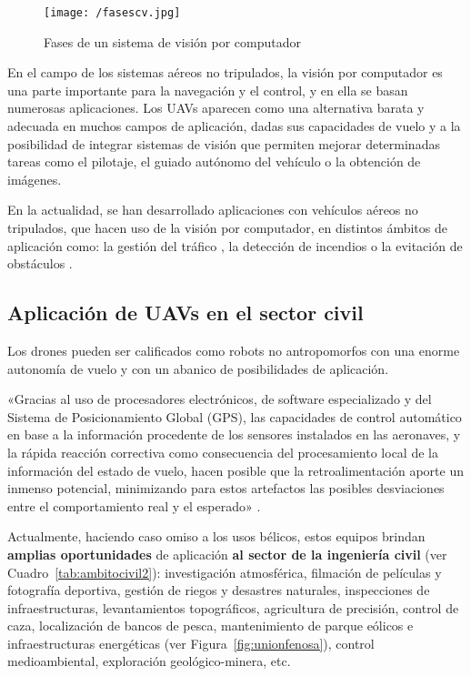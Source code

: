 \begin{figure}[!h]
\begin{center}
\texttt{[image: /fasescv.jpg]}
\caption[Fases de un sistema de visión por computador]{Fases de un sistema de visión por computador \cite{visionporcomputador}}
\label{fig:fasescv}
\end{center}
\end{figure}

En el campo de los sistemas aéreos no tripulados, la visión por computador es una parte importante para la navegación y el control, 
y en ella se basan numerosas aplicaciones. Los \acs{UAV}s aparecen como una alternativa barata y adecuada en muchos campos
de aplicación, dadas sus capacidades de vuelo y a la posibilidad de integrar sistemas de visión que permiten mejorar determinadas 
tareas como el pilotaje, el guiado autónomo del vehículo o la obtención de imágenes.

En la actualidad, se han desarrollado aplicaciones con vehículos aéreos no tripulados, que hacen uso de la visión por computador, en distintos ámbitos de aplicación como: la gestión del tráfico \cite{controltrafico}, la detección de incendios \cite{incendios} o la evitación de obstáculos \cite{obstaculos}.

\subsection{Aplicación de \acs{UAV}s en el sector civil}
\label{sec:ingenieriacivil}

Los drones pueden ser calificados como robots no antropomorfos con una enorme autonomía de vuelo y con un abanico de posibilidades de  aplicación.

«Gracias al uso de procesadores electrónicos, de software especializado y del Sistema de Posicionamiento Global (\acs{GPS}), las capacidades de control automático en base a la información procedente de los sensores instalados en las aeronaves, y la rápida reacción correctiva como consecuencia del procesamiento local de la información del estado de vuelo, hacen posible que la retroalimentación aporte un inmenso potencial,
minimizando para estos artefactos las posibles desviaciones entre el comportamiento real y el esperado» \cite{ambitocivil}.

Actualmente, haciendo caso omiso a los usos bélicos, estos equipos brindan \textbf{amplias oportunidades} de aplicación \textbf{al sector de la ingeniería civil} (ver Cuadro~\ref{tab:ambitocivil2}): investigación atmosférica, filmación de películas y fotografía deportiva, gestión de riegos y desastres naturales, inspecciones de infraestructuras, levantamientos topográficos, agricultura de precisión, control de caza, localización de bancos de pesca, mantenimiento de parque eólicos e infraestructuras energéticas (ver Figura~\ref{fig:unionfenosa}), control medioambiental, exploración geológico-minera, etc.

